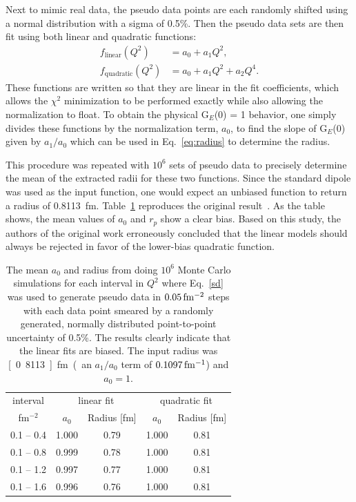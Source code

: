 \documentclass[10pt,superscriptaddress,aps,prc,twocolumn]{revtex4-1}
\begin{document}
Next to mimic real data, the pseudo data points are each randomly shifted using a 
normal distribution with a sigma of 0.5\%. 
Then the pseudo data sets are then fit using both linear and quadratic functions:
\begin{align}
f_{\mathrm{linear}}(Q^2) &  = a_0 + a_1 Q^2, \label{Eq:linear} \\
f_{\mathrm{quadratic}}(Q^2) & = a_0 + a_1 Q^2 + a_2 Q^4. \label{Eq:quadratic}
\end{align}
These functions are written so that they are linear in the fit coefficients,
which
allows the $\chi^2$ minimization to be performed exactly
while also allowing the normalization to float.
To obtain the physical G$_E$(0) = 1 behavior, one simply divides these functions 
by the normalization term, $a_0$, to find the slope of G$_E$(0) given by $a_1/a_0$
which can be used in Eq.~\ref{eq:radius} to determine the radius.

This procedure was repeated with $10^6$ sets of pseudo data to 
precisely determine the mean of the extracted 
radii for these two functions.   Since the standard dipole was used as the input function, one would expect an unbiased 
function to return a radius of 0.8113~fm.
Table~\ref{ztable} reproduces the original result~\cite{Borkowski:1975ume}.
As the table shows, the mean values of $a_0$ and $r_p$ show a clear bias. 
Based on this study, the authors of the original work erroneously concluded 
that the linear models should always be rejected in favor of the lower-bias 
quadratic function.
%
%

\begin{table}
\caption{The mean $a_0$ and radius from doing $10^6$ Monte Carlo simulations
for each interval in $Q^2$
where Eq.~\ref{sd} was used to generate pseudo data in $\unit[0.05]{fm^{-2}}$ steps
with each data point smeared by a randomly generated, normally distributed point-to-point 
uncertainty of 0.5\%.
The results clearly indicate that the linear fits are biased.   The input
radius was \unit[0.8113]{fm} (an $a_1/a_0$ term of $\unit[0.1097]{fm^{-1}}$) and $a_0 = 1$.}
\begin{tabular}{c|cc|cc} \hline
interval       & \multicolumn{2}{c|}{linear fit} & \multicolumn{2}{c}{quadratic fit}  \\
fm$^{-2}$      & $a_0$      & Radius [fm]          & $a_0$    & Radius [fm] \\ \hline
 0.1 -- 0.4 & 1.000& 0.79& 1.000& 0.81 \\
 0.1 -- 0.8 & 0.999& 0.78& 1.000& 0.81 \\
 0.1 -- 1.2 & 0.997& 0.77& 1.000& 0.81 \\
 0.1 -- 1.6 & 0.996& 0.76& 1.000& 0.81 \\ \hline
\end{tabular}
\label{ztable}
\end{table}
\end{document}
